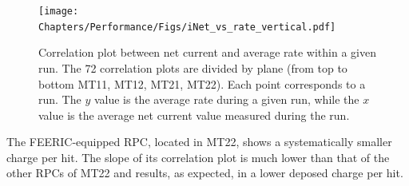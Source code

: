 
\begin{figure}[!t]
\begin{center}
\texttt{[image: Chapters/Performance/Figs/iNet\_vs\_rate\_vertical.pdf]}
\caption{Correlation plot between net current and average rate within a given run. The 72 correlation plots are divided by plane (from top to bottom MT11, MT12, MT21, MT22). Each point corresponds to a run. The $y$ value is the average rate during a given run, while the $x$ value is the average net current value measured during the run.}
\label{fig:iNetvsRate4Planes}
\end{center}
\end{figure}

The FEERIC-equipped RPC, located in MT22, shows a systematically smaller charge per hit.
The slope of its correlation plot is much lower than that of the other RPCs of MT22 and results, as expected, in a lower deposed charge per hit.

